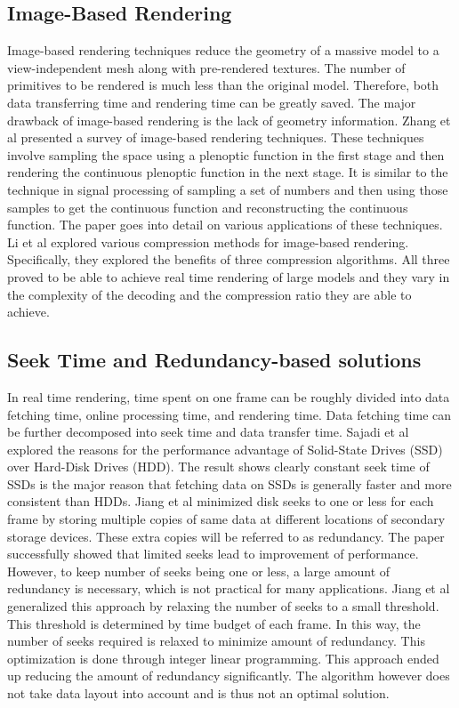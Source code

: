\documentclass[conference]{acmsiggraph}
\begin{document}
\subsection{Image-Based Rendering}

Image-based rendering techniques reduce the geometry of a massive model to a view-independent mesh along with pre-rendered textures. The number of primitives to be rendered is much less than the original model. Therefore, both data transferring time and rendering time can be greatly saved. The major drawback of image-based rendering is the lack of geometry information. Zhang et al \cite{imagebasedrendering} presented a survey of image-based rendering techniques. These techniques involve sampling the space using a plenoptic function in the first stage and then rendering the continuous plenoptic function in the next stage. It is similar to the technique in signal processing of sampling a set of numbers and then using those samples to get the continuous function and reconstructing the continuous function. The paper goes into detail on various applications of these techniques. Li et al \cite{compressionimagebased} explored various compression methods for image-based rendering. Specifically, they explored the benefits of three compression algorithms. All three proved to be able to achieve real time rendering of large models and they vary in the complexity of the decoding and the compression ratio they are able to achieve. 

\subsection{Seek Time and Redundancy-based solutions}

In real time rendering, time spent on one frame can be roughly divided into data fetching time, online processing time, and rendering time. Data fetching time can be further decomposed into seek time and data transfer time. Sajadi et al \cite{ssdpaper} explored the reasons for the performance advantage of Solid-State Drives (SSD) over Hard-Disk Drives (HDD). The result shows clearly constant seek time of SSDs is the major reason that fetching data on SSDs is generally faster and more consistent than HDDs. Jiang et al \cite{singleseeklayout} minimized disk seeks to one or less for each frame by storing multiple copies of same data at different locations of secondary storage devices. These extra copies will be referred to as redundancy. The paper successfully showed that limited seeks lead to improvement of performance. However, to keep number of seeks being one or less, a large amount of redundancy is necessary, which is not practical for many applications. Jiang et al \cite{optimizingredundancy} generalized this approach by relaxing the number of seeks to a small threshold. This threshold is determined by time budget of each frame. In this way, the number of seeks required is relaxed to minimize amount of redundancy. This optimization is done through integer linear programming. This approach ended up reducing the amount of redundancy significantly. The algorithm however does not take data layout into account and is thus not an optimal solution.
\end{document}
